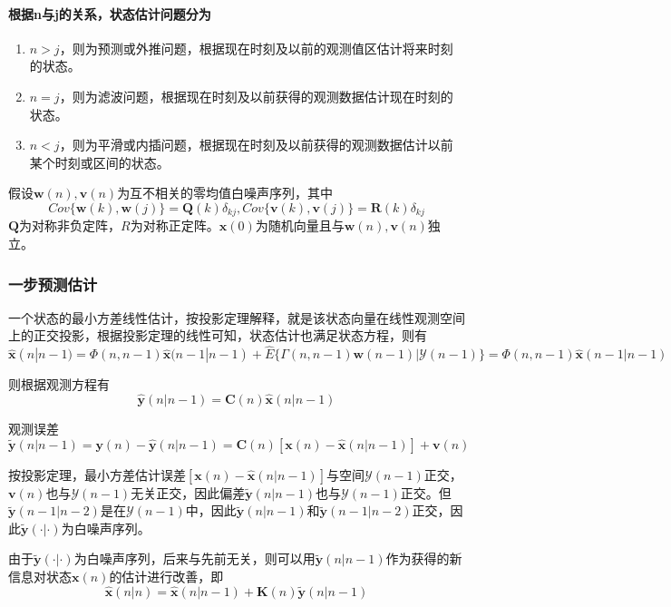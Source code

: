 \documentclass[11pt,a4paper]{ctexart}
\begin{document}
        \paragraph{根据n与j的关系，状态估计问题分为}
        \begin{enumerate}
            \item $n>j$，则为预测或外推问题，根据现在时刻及以前的观测值区估计将来时刻的状态。
            \item $n=j$，则为滤波问题，根据现在时刻及以前获得的观测数据估计现在时刻的状态。
            \item $n<j$，则为平滑或内插问题，根据现在时刻及以前获得的观测数据估计以前某个时刻或区间的状态。
        \end{enumerate}

        假设$\bm w(n),\bm v(n)$为互不相关的零均值白噪声序列，其中
        \[
        Cov\{\bm w(k),\bm w(j)\}=\bm Q(k)\delta_{kj},Cov\{\bm v(k),\bm v(j)\}=\bm R(k)\delta_{kj}
        \]
        $\bm Q$为对称非负定阵，$R$为对称正定阵。$\bm x(0)$为随机向量且与$\bm{w}(n),\bm v(n)$独立。
        \subsubsection{一步预测估计}
            一个状态的最小方差线性估计，按投影定理解释，就是该状态向量在线性观测空间上的正交投影，根据投影定理的线性可知，状态估计也满足状态方程，则有
            \[
            \bm{\hat x}(n|n-1)=\bm{\varPhi}(n,n-1)\bm{\hat x}(n-1|n-1)+\hat E\{\bm{\varGamma}(n,n-1)\bm{w}(n-1)|\mathscr{Y}(n-1)\}=\bm{\varPhi}(n,n-1)\bm{\hat x}(n-1|n-1)
            \]

            则根据观测方程有
            \[
            \bm{\hat y}(n|n-1)=\bm{C}(n)\bm{\hat x}(n|n-1)
            \]

            观测误差
            \[
            \bm{\tilde y}(n|n-1)=\bm y(n)-\bm{\hat y}(n|n-1)=\bm C(n)[\bm x(n)-\bm{\hat x}(n|n-1)]+\bm v(n)
            \]

            按投影定理，最小方差估计误差$[\bm x(n)-\bm{\hat x}(n|n-1)]$与空间$\mathscr{Y}(n-1)$正交，$\bm v(n)$也与$\mathscr{Y}(n-1)$无关正交，因此偏差$\bm{\tilde y}(n|n-1)$也与$\mathscr{Y}(n-1)$正交。但$\bm{\tilde y}(n-1|n-2)$是在$\mathscr{Y}(n-1)$中，因此$\bm{\tilde y}(n|n-1)$和$\bm{\tilde y}(n-1|n-2)$正交，因此$\bm{\tilde y}(\cdot|\cdot)$为白噪声序列。

            由于$\bm{\tilde y}(\cdot|\cdot)$为白噪声序列，后来与先前无关，则可以用$\bm{\tilde y}(n|n-1)$作为获得的新信息对状态$\bm x(n)$的估计进行改善，即
            \[
            \bm{\hat x}(n|n)=\bm{\hat x}(n|n-1)+\bm K(n)\bm{\tilde y}(n|n-1)
            \]
\end{document}
